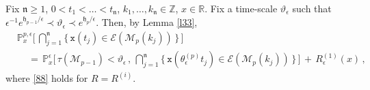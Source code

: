 \documentclass[reqno]{amsart}
\theoremstyle{plain}
\theoremstyle{definition}
\newcommand{\mf}[1]{{\mathfrak #1}}
\newcommand{\bb}[1]{{\mathbb #1}}
\newcommand{\ms}[1]{{\mathscr #1}}
\newcommand{\mtt}[1]{{\mathtt #1}}
\newcommand{\<}{\langle}
\renewcommand{\>}{\rangle}
\begin{document}
Fix $\mf n\ge 1$, $0<t_1< \dots <t_{\mf n}$,
$k_1, \dots, k_{\mf n} \in \bb Z$, $x\in \bb R$.  Fix a time-scale
$\vartheta_\epsilon$ such that
$\epsilon^{-1} e^{\mf h_{p-1}/\epsilon} \prec \vartheta_\epsilon \prec
e^{\mf h_{p}/\epsilon} $.  Then, by Lemma \ref{l33},
\begin{equation}
\label{86}
\begin{aligned}
& \bb P^{p,\epsilon}_x\Big[\,
\bigcap_{j=1}^{\mf n} \big\{\, \mtt x (t_{j})
\in \ms E (\ms M_p(k_j))\,\big\}\,\Big]
\\ &\quad 
\,=\,
\bb P^\epsilon_x\Big[\, \tau(\ms M_{p-1}) < \vartheta_\epsilon \,,\,
\bigcap_{j=1}^{\mf n} \big\{\, \mtt x (\theta_{\epsilon}^{(p)}
t_{j}) \in \ms E (\ms M_p(k_j))\,\big\}\,\Big]
\,+\, R^{(1)}_\epsilon (x) \,,
\end{aligned}
\end{equation}
where \eqref{88} holds for $R=R^{(i)}$.
\end{document}
